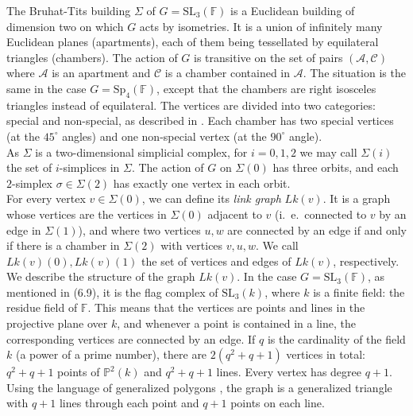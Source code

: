 \documentclass{article}
\theoremstyle{definition}
\theoremstyle{remark}
\theoremstyle{plain}
\begin{document}
The Bruhat-Tits building $\Sigma$ of $G=\mathrm{SL}_3(\mathbb{F})$ is a Euclidean building of dimension two on which $G$ acts by isometries. It is a union of infinitely many Euclidean planes (apartments), each of them being tessellated by equilateral triangles (chambers). The action of $G$ is transitive on the set of pairs $(\mathcal{A},\mathcal{C})$ where $\mathcal{A}$ is an apartment and $\mathcal{C}$ is a chamber contained in $\mathcal{A}$. The situation is the same in the case $G=\mathrm{Sp}_4(\mathbb{F})$, except that the chambers are right isosceles triangles instead of equilateral. The vertices are divided into two categories: special and non-special, as described in \cite{buildspn,expspn,zetasp4}. Each chamber has two special vertices (at the $45^\circ$ angles) and one non-special vertex (at the $90^\circ$ angle). \\

As $\Sigma$ is a two-dimensional simplicial complex, for $i=0,1,2$ we may call $\Sigma(i)$ the set of $i$-simplices in $\Sigma$. The action of $G$ on $\Sigma(0)$ has three orbits, and each $2$-simplex $\sigma\in\Sigma(2)$ has exactly one vertex in each orbit. \\

For every vertex $v\in\Sigma(0)$, we can define its \textit{link graph} $Lk(v)$. It is a graph whose vertices are the vertices in $\Sigma(0)$ adjacent to $v$ (i.~e.~connected to $v$ by an edge in $\Sigma(1)$), and where two vertices $u,w$ are connected by an edge if and only if there is a chamber in $\Sigma(2)$ with vertices $v,u,w$. We call $Lk(v)(0),Lk(v)(1)$ the set of vertices and edges of $Lk(v)$, respectively. \\

We describe the structure of the graph $Lk(v)$. In the case $G=\mathrm{SL}_3(\mathbb{F})$, as mentioned in \cite{buildings} (6.9), it is the flag complex of $\mathrm{SL}_3(k)$, where $k$ is a finite field: the residue field of $\mathbb{F}$. This means that the vertices are points and lines in the projective plane over $k$, and whenever a point is contained in a line, the corresponding vertices are connected by an edge. If $q$ is the cardinality of the field $k$ (a power of a prime number), there are $2(q^2+q+1)$ vertices in total: $q^2+q+1$ points of $\mathbb{P}^2(k)$ and $q^2+q+1$ lines. Every vertex has degree $q+1$. Using the language of generalized polygons \cite{feithigman}, the graph is a generalized triangle with $q+1$ lines through each point and $q+1$ points on each line. \\
\end{document}
